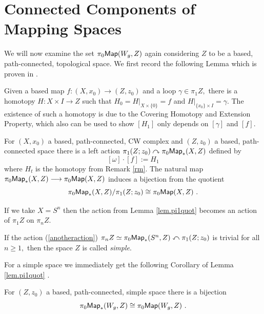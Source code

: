 






\section{Connected Components of Mapping Spaces} \label{sec.connectedcomponents}
We will now examine the set $\pi_{0}{\sf Map}(W_{g}, Z)$ again considering $Z$ to be a based, path-connected, topological space. We first record the following Lemma which is proven in \cite{MoreMay}.

\begin{remark} \label{rm}
Given a based map $f: (X, x_{0}) \longrightarrow (Z, z_{0})$ and a loop $\gamma \in \pi_{1}Z,$ there is a homotopy $H: X \times I \longrightarrow Z$ such that $H_{0} = H|_{X \times \{0\}} = f$ and $H|_{\{x_{0}\} \times I} = \gamma.$ The existence of such a homotopy is due to the Covering Homotopy and Extension Property, which also can be used to show $[H_{1}]$ only depends on $[\gamma]$ and $[f].$
\end{remark}
\begin{lemma} \label{lem.pi1quot}
For $(X, x_{0})$ a based, path-connected, CW complex and $(Z, z_{0})$ a based, path-connected space there is a left action $\pi_{1}(Z; z_{0}) \curvearrowright \pi_{0}{\sf Map}_{\ast}(X, Z)$
defined by
\begin{equation} \label{anotheraction}
[\omega] \cdot [f] := H_{1}
\end{equation}
where $H_{t}$ is the homotopy from Remark \ref{rm}.
The natural map $\pi_{0}{\sf Map}_{\ast}(X, Z) \longrightarrow \pi_{0}{\sf Map}(X, Z)$ induces a bijection from the quotient
\[
\pi_{0}{\sf Map}_{\ast}(X, Z)/\pi_{1}(Z; z_{0}) \cong \pi_{0}{\sf Map}(X, Z)~.
\] 
\end{lemma}


If we take $X = S^{n}$ then the action from Lemma \ref{lem.pi1quot} becomes an action of $\pi_{1}Z$ on $\pi_{n}Z.$
\begin{definition}
If the action (\ref{anotheraction}) $\pi_{n}Z \simeq \pi_{0}{\sf Map}_{\ast}(S^{n}, Z) \curvearrowleft \pi_{1}(Z; z_{0})$ is trivial for all $n \geq 1,$ then the space $Z$ is called \textit{simple}. 
\end{definition}

For a simple space we immediately get the following Corollary of Lemma \ref{lem.pi1quot} .
\begin{cor}\label{cor.simple}
For $(Z, z_{0})$ a based, path-connected, simple space there is a bijection
\[
\pi_{0}{\sf Map}_{\ast}(W_{g}, Z) \cong \pi_{0}{\sf Map}(W_{g}, Z)~.
\]
\end{cor}

